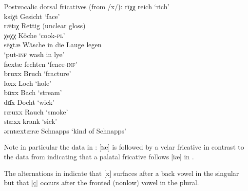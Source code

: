 \ea%
\label{ex:6:48}Postvocalic dorsal fricatives (from /x/):
\ea\label{ex:6:48a} rīχχ       \tab [riːçç]      \tab  reich                     \tab ‘rich’                          \\
    ksiχt      \tab [ksiçt]      \tab  Gesicht                   \tab ‘face’                         \\
    r\={æ}tɩχ  \tab [ræːtɪç]     \tab  Rettig                    \tab (unclear gloss)                 \\
    χeχχ       \tab [çeçç]       \tab  Köche                     \tab ‘cook-\textsc{pl}’                        \\
    sēχtæ      \tab [seːçtæ]     \tab  Wäsche in die Lauge legen \\ \tab \tab  ‘put-\textsc{inf} wash in lye’  \\
\ex\label{ex:6:48b} fæxtæ      \tab [fæxtæ]      \tab  fechten                   \tab ‘fence-\textsc{inf}’           \\
\ex\label{ex:6:48c} bruxx      \tab [bruxx]      \tab  Bruch                     \tab ‘fracture’                     \\
    loxx       \tab [loxx]       \tab  Loch                      \tab ‘hole’                         \\
    bɑxx       \tab [bɑxx]       \tab  Bach                      \tab ‘stream’                       \\
    dɑ̄x        \tab [dɑːx]       \tab  Docht                     \tab ‘wick’                         \\
    ræuxx      \tab [ræuxx]      \tab  Rauch                     \tab ‘smoke’                        \\
\ex\label{ex:6:48d} sɩæxx      \tab [sɪæxx]      \tab  krank                     \tab ‘sick’                         \\
    ərnɩæxtæræ \tab [ərnɪæxtæræ] \tab  Schnapps                  \tab ‘kind of Schnapps’             \\
\z 
\z


Note in particular the data in : [ɪæ] is followed by a velar fricative in contrast to the data from  indicating that a palatal fricative follows [iæ] in .

The  alternations in  indicate that [x] surfaces after a back vowel in the singular but that [ç] occurs after the fronted (nonlow) vowel in the plural.

